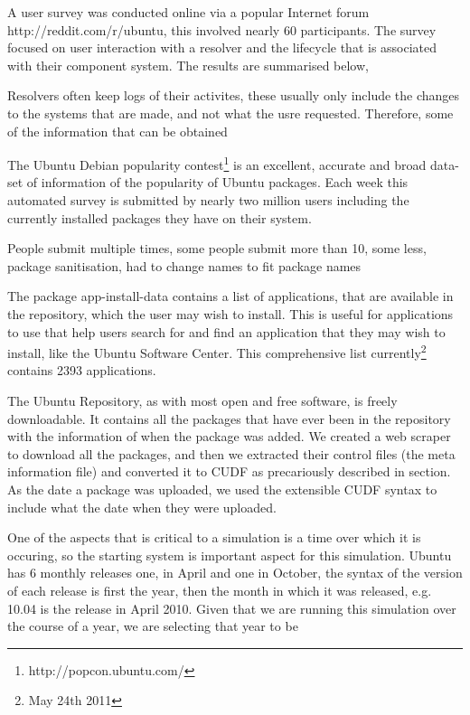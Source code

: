 A user survey was conducted online via a popular Internet forum http://reddit.com/r/ubuntu, this involved nearly 60 participants. %
The survey focused on user interaction with a resolver and the lifecycle that is associated with their component system.
The results are summarised below, %

Resolvers often keep logs of their activites, these usually only include the changes to the systems that are made, and not what the usre requested.
Therefore, some of the information that can be obtained

The Ubuntu Debian popularity contest\footnote{http://popcon.ubuntu.com/} is an excellent, accurate and broad data-set of information of the popularity of Ubuntu packages.
Each week this automated survey is submitted by nearly two million users including the currently installed packages they have on their system.

People submit multiple times, some people submit more than 10, some less, package sanitisation, had to change names to fit package names

The package app-install-data contains a list of applications, that are available in the repository, which the user may wish to install.
This is useful for applications to use that help users search for and find an application that they may wish to install, like the Ubuntu Software Center.
This comprehensive list currently\footnote{May 24th 2011} contains 2393 applications.

The Ubuntu Repository, as with most open and free software, is freely downloadable.
It contains all the packages that have ever been in the repository with the information of when the package was added.
We created a web scraper to download all the packages, and then we extracted their control files (the meta information file) and converted it to CUDF as precariously described in section. %
As the date a package was uploaded, we used the extensible CUDF syntax to include what the date when they were uploaded.

One of the aspects that is critical to a simulation is a time over which it is occuring, 
so the starting system is important aspect for this simulation.
Ubuntu has 6 monthly releases one, in April and one in October, the syntax of the version of each release is first the year,
then the month in which it was released, e.g. 10.04 is the release in April 2010.
Given that we are running this simulation over the course of a year, we are selecting that year to be 


